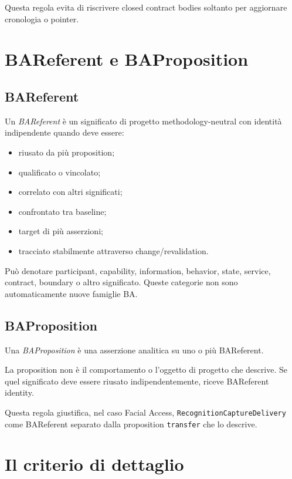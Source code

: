 \documentclass[11pt,a4paper]{article}
\newcommand{\code}[1]{\nolinkurl{#1}}
\newcommand{\BAR}{\textit{BAReferent}}
\newcommand{\BAP}{\textit{BAProposition}}
\begin{document}
Questa regola evita di riscrivere closed contract bodies soltanto per aggiornare cronologia o pointer.

\section{BAReferent e BAProposition}

\subsection{BAReferent}

Un \BAR{} è un significato di progetto methodology-neutral con identità indipendente quando deve essere:

\begin{itemize}
\item riusato da più proposition;
\item qualificato o vincolato;
\item correlato con altri significati;
\item confrontato tra baseline;
\item target di più asserzioni;
\item tracciato stabilmente attraverso change/revalidation.
\end{itemize}

Può denotare participant, capability, information, behavior, state, service, contract, boundary o altro significato. Queste categorie non sono automaticamente nuove famiglie BA.

\subsection{BAProposition}

Una \BAP{} è una asserzione analitica su uno o più BAReferent.

\begin{closedbox}
La proposition non è il comportamento o l'oggetto di progetto che descrive. Se quel significato deve essere riusato indipendentemente, riceve BAReferent identity.
\end{closedbox}

Questa regola giustifica, nel caso Facial Access, \code{RecognitionCaptureDelivery} come BAReferent separato dalla proposition \code{transfer} che lo descrive.

\section{Il criterio di dettaglio}
\end{document}
